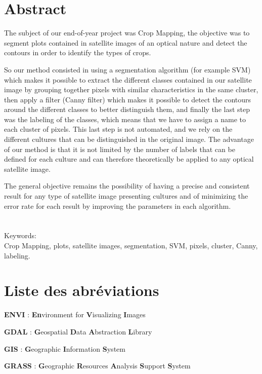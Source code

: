 \documentclass[12pt, openany]{report}
\begin{document}
\chapter*{Abstract}

The subject of our end-of-year project was Crop Mapping, the objective was to segment plots contained in satellite images of an optical nature and detect the contours in order to identify the types of crops.
\par
So our method consisted in using a segmentation algorithm (for example SVM) which makes it possible to extract the different classes contained in our satellite image by grouping together pixels with similar characteristics in the same cluster, then apply a filter (Canny filter) which makes it possible to detect the contours around the different classes to better distinguish them, and finally the last step was the labeling of the classes, which means that we have to assign a name to each cluster of pixels. This last step is not automated, and we rely on the different cultures that can be distinguished in the original image. The advantage of our method is that it is not limited by the number of labels that can be defined for each culture and can therefore theoretically be applied to any optical satellite image.
\par
The general objective remains the possibility of having a precise and consistent result for any type of satellite image presenting cultures and of minimizing the error rate for each result by improving the parameters in each algorithm.
\\
\\
\\
Keywords:\\
Crop Mapping, plots, satellite images, segmentation, SVM, pixels, cluster, Canny, labeling.


\chapter*{Liste des abréviations}
 
\textbf{ENVI} : \textbf{En}vironment for \textbf{V}isualizing \textbf{I}mages
 
\textbf{GDAL} : \textbf{G}eospatial \textbf{D}ata \textbf{A}bstraction \textbf{L}ibrary
 
\textbf{GIS} : \textbf{G}eographic \textbf{I}nformation \textbf{S}ystem
 
\textbf{GRASS} : \textbf{G}eographic \textbf{R}esources \textbf{A}nalysis \textbf{S}upport \textbf{S}ystem
 
\end{document}
